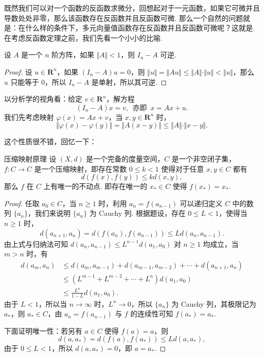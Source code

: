 既然我们可以对一个函数的反函数求微分，回想起对于一元函数，如果它可微并且导数处处非零，那么该函数存在反函数并且反函数可微. 那么一个自然的问题就是：在什么样的条件下，多元向量值函数存在反函数并且反函数可微呢？这就是. 在考虑反函数定理之前，我们先看一个小小的比喻.

\begin{example}{}{}
    设 $A$ 是一个 $n$ 阶方阵，如果 $\Vert A\Vert < 1$，则 $I_n - A$ 可逆.
\end{example}

\begin{proof}
    设 $u\in \mathbf{R}^n$，如果 $(I_n - A)u = 0$，则 $\Vert u\Vert = \Vert Au\Vert \leqslant \Vert A\Vert \cdot \Vert u\Vert < \Vert u\Vert$，那么 $u$ 只能等于 $0$，所以 $I_n - A$ 是单射，所以其可逆.
\end{proof}

以分析学的视角看：给定 $v\in \mathbf{R}^n$，解方程 \[(I_n - A)x = v,\enspace\text{亦即}\enspace x = Ax+u.\]
我们先考虑映射 $\varphi(x) = Ax+v$，当 $x,y\in \mathbf{R}^n$ 时，\[\Vert \varphi(x) - \varphi(y)\Vert = \Vert A(x - y)\Vert\leqslant \Vert A\Vert\cdot \Vert x - y\Vert.\]

这个性质很不错，回忆一下：

\begin{theorem}{压缩映射原理}{}
    设 $(X,d)$ 是一个完备的度量空间，$C$ 是一个非空闭子集，$f\colon C\to C$ 是一个压缩映射，即存在常数 $0\leqslant k < 1$ 使得对于任意 $x, y\in C$ 都有 \[d(f(x), f(y))\leqslant kd(x, y),\]那么 $f$ 在 $C$ 上有唯一的不动点. 即存在唯一的 $x_*\in C$ 使得 $f(x_*) = x_*$.
\end{theorem}

\begin{proof}
    任取 $a_0 \in C$，当 $n\geqslant 1$ 时，利用 $a_n = f(a_{n-1})$ 可以递归定义 $C$ 中的数列 $\{a_n\}$，我们来说明 $\{a_n\}$ 为 Cauchy 列. 根据题设，存在 $0\leqslant L <1$，使得当 $n\geqslant 1$ 时，\[d(a_{n+1}, a_n) = d(f(a_n), f(a_{n-1}))\leqslant Ld(a_n, a_{n-1}).\]
    由上式与归纳法可知 $d(a_n,a_{n-1})\leqslant L^{n-1}d(a_1, a_0)$ 对 $n\geqslant 1$ 均成立，当 $m > n$ 时，有
    \[\begin{aligned}
            d(a_m, a_n) & \leqslant d(a_m, a_{m-1}) + d(a_{m-1}, a_{m-2}) + \cdots + d(a_{n+1}, a_n) \\
                        & \leqslant (L^{m-1} + L^{m-2} + \cdots + L^{n})d(a_1, a_0)                  \\
                        & \leqslant \frac{L^n}{1-L}d(a_1, a_0).
        \end{aligned}\]
    由于 $L < 1$，所以当 $n\to\infty$ 时，$L^n\to 0$，所以 $\{a_n\}$ 为 Cauchy 列，其极限记为 $a_*$，则 $a_*\in C$，由 $a_n = f(a_{n-1})$ 与 $f$ 的连续性可知 $f(a_*) = a_*$.

    下面证明唯一性：若另有 $a\in C$ 使得 $f(a) = a$，则\[d(a, a_*) = d(f(a), f(a_*))\leqslant Ld(a, a_*),\]由于 $0\leqslant L < 1$，所以 $d(a, a_*) = 0$，即 $a = a_*$.
\end{proof}

